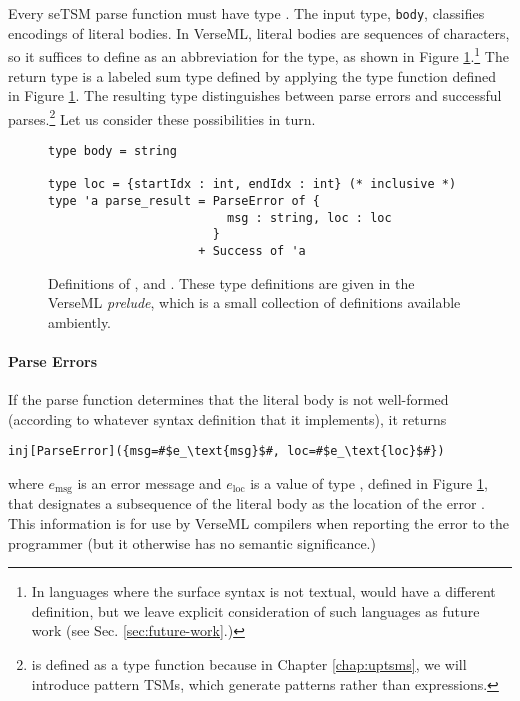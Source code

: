 Every seTSM parse function must have type . The input type, \lstinline{body}, classifies encodings of literal {bodies}. In VerseML, literal bodies are sequences of characters, so it suffices to define  as an abbreviation for the  type, as shown in Figure \ref{fig:indexrange-and-parseresult}.\footnote{In languages where the surface syntax is not textual,  would have a different definition, but we leave explicit consideration of such languages as future work (see Sec. \ref{sec:future-work}.)} The return type is a labeled sum type defined by applying the type function  defined in Figure \ref{fig:indexrange-and-parseresult}. The resulting type distinguishes between parse errors and successful parses.\footnote{ is defined as a type function because in Chapter \ref{chap:uptsms}, we will introduce pattern TSMs, which generate patterns rather than expressions.} Let us consider these possibilities in turn.
\begin{figure}
\begin{lstlisting}[numbers=none]
type body = string

type loc = {startIdx : int, endIdx : int} (* inclusive *)
type 'a parse_result = ParseError of {
                         msg : string, loc : loc
                       }
                     + Success of 'a 
\end{lstlisting}
\caption[Definitions of ,  and  in VerseML]{Definitions of ,  and . These type definitions are given in the VerseML \emph{prelude}, which is a small collection of definitions available ambiently.}
\label{fig:indexrange-and-parseresult}
\end{figure}

\paragraph{Parse Errors} If the parse function determines that the literal body is not well-formed (according to whatever syntax definition that it implements), it returns
\begin{lstlisting}[numbers=none]
inj[ParseError]({msg=#$e_\text{msg}$#, loc=#$e_\text{loc}$#})
\end{lstlisting}
where $e_\text{msg}$ is an error message and $e_\text{loc}$ is a value of type , defined in Figure \ref{fig:indexrange-and-parseresult}, that designates a subsequence of the literal body as the location of the error \cite{DBLP:journals/jsc/DeursenKT93}. This information is for use by VerseML compilers when reporting the error to the programmer (but it otherwise has no semantic significance.)


